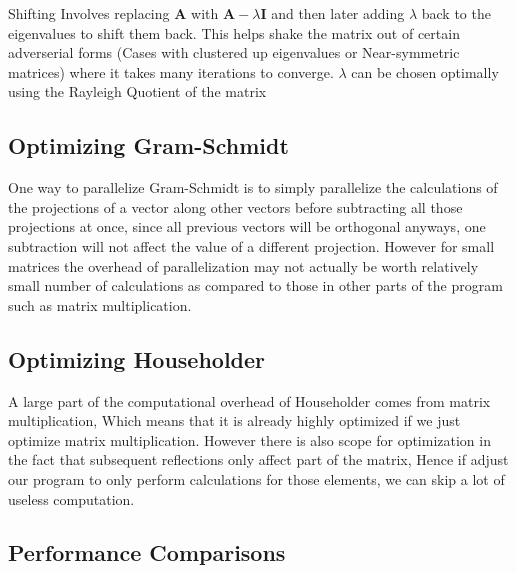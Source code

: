 \documentclass[12pt,a4paper]{article}
\let\vec\mathbf
\begin{document}
\bigskip

Shifting Involves replacing $\vec{A}$ with $\vec{A} - \lambda\vec{I}$ and then later adding $\lambda$ back to the eigenvalues to shift them back. This helps shake the matrix out of certain adverserial forms (Cases with clustered up eigenvalues or Near-symmetric matrices) where it takes many iterations to converge. $\lambda$ can be chosen optimally using the Rayleigh Quotient of the matrix 
\\

\subsection{Optimizing Gram-Schmidt}

One way to parallelize Gram-Schmidt is to simply parallelize the calculations of the projections of a vector along other vectors before subtracting all those projections at once, since all previous vectors will be orthogonal anyways, one subtraction will not affect the value of a different projection. However for small matrices the overhead of parallelization may not actually be worth relatively small number of calculations as compared to those in other parts of the program such as matrix multiplication. %

\subsection{Optimizing Householder}

A large part of the computational overhead of Householder comes from matrix multiplication, Which means that it is already highly optimized if we just optimize matrix multiplication. However there is also scope for optimization in the fact that subsequent reflections only affect part of the matrix, Hence if adjust our program to only perform calculations for those elements, we can skip a lot of useless computation. %

\subsection{Performance Comparisons}

\end{document}
